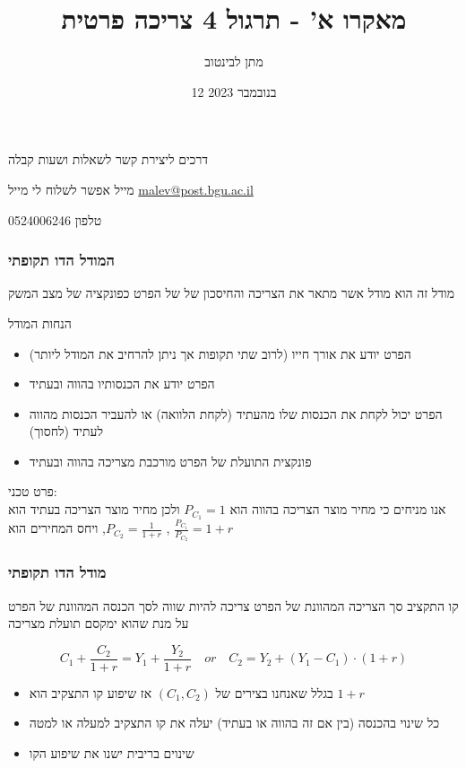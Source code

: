 \documentclass[usenames,dvipsnames]{beamer}
\title[]{{מאקרו א' - תרגול 4 צריכה פרטית}}
\author{\texthebrew{ מתן לבינטוב}}
\institute[{{ אב"ג}}]{{ אוניברסיטת בן גוריון בנגב}}
\date{12 בנובמבר 2023}
\begin{document}
\begin{RTL}
\begin{frame}
\titlepage
\end{frame}

\begin{frame}{דרכים ליצירת קשר לשאלות ושעות קבלה}
    \begin{block}{מייל}
    אפשר לשלוח לי מייל \href{mailto:malev@post.bgu.ac.il}{malev@post.bgu.ac.il}
    \end{block}
    \begin{block}{טלפון}
    0524006246
        
    \end{block}
\end{frame}

\begin{frame}
    \frametitle{המודל הדו תקופתי}
    מודל זה הוא מודל אשר מתאר את הצריכה והחיסכון של של הפרט כפונקציה של מצב המשק
    \begin{block}{הנחות המודל}
        \begin{itemize}
            \item הפרט יודע את אורך חייו (לרוב שתי תקופות אך ניתן להרחיב את המודל ליותר)
            \item הפרט יודע את הכנסותיו בהווה ובעתיד
            \item הפרט יכול לקחת את הכנסות שלו מהעתיד (לקחת הלוואה) או להעביר הכנסות מהווה לעתיד (לחסוך)
            \item פונקצית התועלת של הפרט מורכבת מצריכה בהווה ובעתיד
        \end{itemize}
    \end{block}
    
    פרט טכני: \\ 
    אנו מניחים כי מחיר מוצר הצריכה בהווה הוא $P_{C_1} = 1$ ולכן מחיר מוצר הצריכה בעתיד הוא $P_{C_2} = \frac{1}{1+r}$, ויחס המחירים הוא , $\frac{P_{C_1}}{P_{C_2}} = 1 + r$ 

\end{frame}

\begin{frame}
    \frametitle{מודל הדו תקופתי}
    \begin{block}{קו התקציב}
        סך הצריכה המהוונת של הפרט צריכה להיות שווה לסך הכנסה המהוונת של הפרט על מנת שהוא ימקסם תועלת מצריכה
        
        $$
        C_1 + \frac{C_2}{1+r} = Y_1 + \frac{Y_2}{1+r} \quad or \quad  C_2 = Y_2 + (Y_1-C_1) \cdot (1+r)
        $$
    \end{block}
    \begin{itemize}
        \item  בגלל שאנחנו בצירים של $(C_1,C_2)$ אז שיפוע קו התצקיב הוא $1+r$ 
        \item כל שינוי בהכנסה (בין אם זה בהווה או בעתיד) יעלה את קו התצקיב למעלה או למטה
        \item שינוים בריבית ישנו את שיפוע הקו
    \end{itemize}


\end{frame}
\end{RTL}
\end{document}
